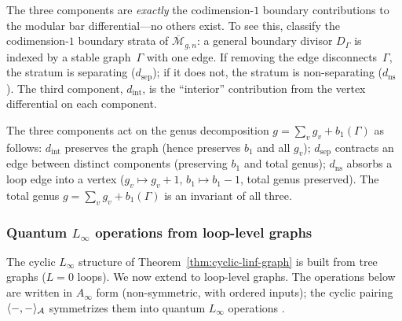 \begin{remark}
\label{rem:genus-bookkeeping}
The three components are \emph{exactly} the codimension-$1$ boundary
contributions to the modular bar differential---no others exist.
To see this, classify the codimension-$1$ boundary strata of
$\overline{\mathcal{M}}_{g,n}$: a general boundary divisor $D_\Gamma$
is indexed by a stable graph~$\Gamma$ with one edge.
If removing the edge disconnects~$\Gamma$, the stratum is separating
($d_{\mathrm{sep}}$); if it does not, the stratum is non-separating
($d_{\mathrm{ns}}$).  The third component, $d_{\mathrm{int}}$, is
the ``interior'' contribution from the vertex differential on each
component.

The three components act on the genus decomposition
$g = \sum_v g_v + b_1(\Gamma)$ as follows:
$d_{\mathrm{int}}$ preserves the graph
(hence preserves $b_1$ and all $g_v$);
$d_{\mathrm{sep}}$ contracts an edge between distinct components
(preserving $b_1$ and total genus);
$d_{\mathrm{ns}}$ absorbs a loop edge into a vertex
($g_v \mapsto g_v + 1$, $b_1 \mapsto b_1 - 1$, total
genus preserved).
The total genus $g = \sum_v g_v + b_1(\Gamma)$ is an invariant
of all three.
\end{remark}

\subsubsection{Quantum \texorpdfstring{$L_\infty$}{L-infinity} operations from loop-level graphs}
\label{subsubsec:quantum-linf-from-graphs}

The cyclic $L_\infty$ structure of
Theorem~\ref{thm:cyclic-linf-graph} is built from tree graphs
($L = 0$ loops).  We now extend to loop-level graphs.
The operations below are written in $A_\infty$ form
(non-symmetric, with ordered inputs); the cyclic pairing
$\langle -, - \rangle_{\mathcal{A}}$ symmetrizes them into quantum
$L_\infty$ operations \cite{BL15, Markl06}.

